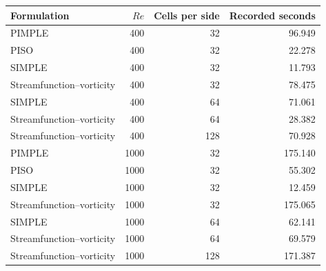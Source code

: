 \begin{center}\small
\begin{tabular}{lrrr}\toprule
Formulation & $Re$ & Cells per side & Recorded seconds\\\midrule
PIMPLE & 400 & 32 & 96.949\\
PISO & 400 & 32 & 22.278\\
SIMPLE & 400 & 32 & 11.793\\
Streamfunction--vorticity & 400 & 32 & 78.475\\
SIMPLE & 400 & 64 & 71.061\\
Streamfunction--vorticity & 400 & 64 & 28.382\\
Streamfunction--vorticity & 400 & 128 & 70.928\\
PIMPLE & 1000 & 32 & 175.140\\
PISO & 1000 & 32 & 55.302\\
SIMPLE & 1000 & 32 & 12.459\\
Streamfunction--vorticity & 1000 & 32 & 175.065\\
SIMPLE & 1000 & 64 & 62.141\\
Streamfunction--vorticity & 1000 & 64 & 69.579\\
Streamfunction--vorticity & 1000 & 128 & 171.387\\
\bottomrule\end{tabular}\end{center}
